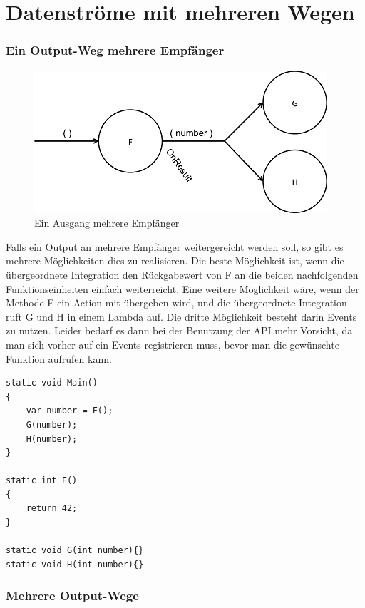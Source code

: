 \section{Datenströme mit mehreren Wegen}

\subsubsection{Ein Output-Weg mehrere Empfänger}

\begin{figure}[H]
	\centering
	\includegraphics[width=.7\linewidth]{./img/diagramOut1to2.png}
	\caption{Ein Ausgang mehrere Empfänger}
\end{figure}


Falls ein Output an mehrere Empfänger weitergereicht werden soll, so gibt es
mehrere Möglichkeiten dies zu realisieren.
Die beste Möglichkeit ist, wenn die übergeordnete Integration den Rückgabewert
von F an die beiden nachfolgenden Funktionseinheiten einfach weiterreicht.
Eine weitere Möglichkeit wäre, wenn der Methode F ein Action mit übergeben wird,
und die übergeordnete Integration ruft G und H in einem Lambda auf.
Die dritte Möglichkeit besteht darin Events zu nutzen.
Leider bedarf es dann bei der Benutzung der API mehr Vorsicht, da man sich vorher auf ein Events registrieren muss, bevor man
die gewünschte Funktion aufrufen kann.

\begin{lstlisting}[caption= Mehrere Empfänger eines Outputs]
static void Main()
{ 
    var number = F();
    G(number);
    H(number);
}

static int F()
{
	return 42;
}

static void G(int number){}
static void H(int number){}
\end{lstlisting}




\subsubsection{Mehrere Output-Wege}

